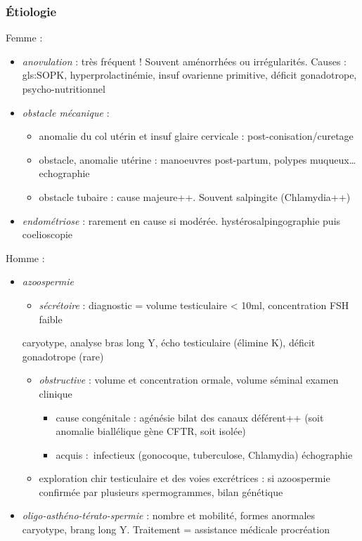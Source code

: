 \documentclass[11pt]{article}
\begin{document}
\subsubsection{Étiologie}
\label{sec:org0b0e201}
Femme :
\begin{itemize}
\item \emph{anovulation} : très fréquent ! Souvent aménorrhées ou irrégularités. Causes :
gls:SOPK, hyperprolactinémie, insuf ovarienne primitive, déficit gonadotrope, psycho-nutritionnel
\item \emph{obstacle mécanique} :
\begin{itemize}
\item anomalie du col utérin et insuf glaire cervicale : post-conisation/curetage
\item obstacle, anomalie utérine : manoeuvres post-partum, polypes muqueux\ldots{} \thus
echographie
\item obstacle tubaire : cause majeure++. Souvent salpingite (Chlamydia++)
\end{itemize}
\item \emph{endométriose} : rarement en cause si modérée. hystérosalpingographie puis coelioscopie
\end{itemize}
Homme :
\begin{itemize}
\item \emph{azoospermie}
\begin{itemize}
\item \emph{sécrétoire} : diagnostic = volume testiculaire < 10ml, concentration FSH
faible
\end{itemize}
\thus caryotype, analyse bras long Y, écho testiculaire (élimine K), déficit gonadotrope (rare)
\begin{itemize}
\item \emph{obstructive} : volume et concentration ormale, volume séminal \dec \thus
examen clinique
\begin{itemize}
\item cause congénitale : agénésie bilat des canaux déférent++ (soit anomalie
biallélique gène CFTR, soit isolée)
\item acquis : infectieux  (gonocoque, tuberculose, Chlamydia) \thus échographie
\end{itemize}
\item exploration chir testiculaire et des voies excrétrices : si azoospermie
confirmée par plusieurs spermogrammes, bilan génétique
\end{itemize}
\item \emph{oligo-asthéno-térato-spermie} : \dec nombre et mobilité, \inc formes anormales
\thus caryotype, brang long Y. Traitement = assistance médicale procréation
\end{itemize}
\end{document}
